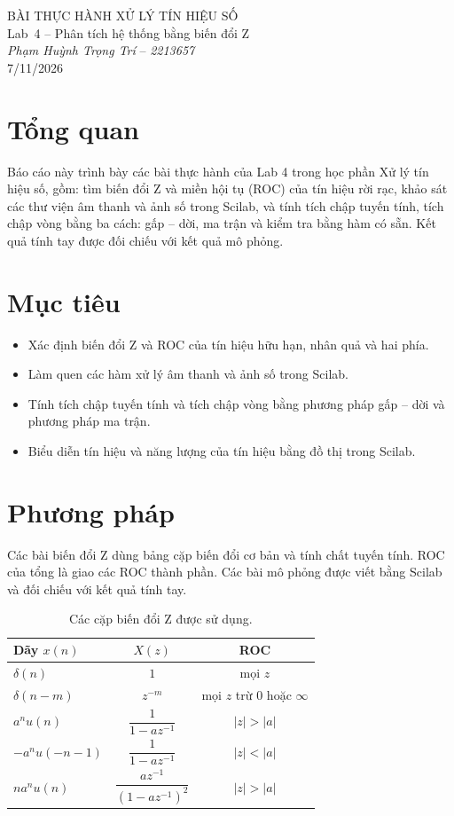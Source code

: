 \documentclass[12pt,a4paper]{article}
\newcommand{\ngaynop}{7/11/2026}
\newcommand{\thanhvien}{%
  \textit{Phạm Huỳnh Trọng Trí} -- \textit{2213657}}
\begin{document}
\begin{center}
  {\Large BÀI THỰC HÀNH XỬ LÝ TÍN HIỆU SỐ}\\[1.2em]
  {\Large Lab\ 4 -- Phân tích hệ thống bằng biến đổi Z}\\[1.5em]
  \thanhvien\\[1.5em]
  \ngaynop
\end{center}

\section*{Tổng quan}
Báo cáo này trình bày các bài thực hành của Lab 4 trong học phần Xử lý tín hiệu số, gồm:
tìm biến đổi Z và miền hội tụ (ROC) của tín hiệu rời rạc, khảo sát các thư viện âm thanh và
ảnh số trong Scilab, và tính tích chập tuyến tính, tích chập vòng bằng ba cách: gấp -- dời,
ma trận và kiểm tra bằng hàm có sẵn. Kết quả tính tay được đối chiếu với kết quả mô phỏng.

\section*{Mục tiêu}
\begin{itemize}[nosep]
  \item Xác định biến đổi Z và ROC của tín hiệu hữu hạn, nhân quả và hai phía.
  \item Làm quen các hàm xử lý âm thanh và ảnh số trong Scilab.
  \item Tính tích chập tuyến tính và tích chập vòng bằng phương pháp gấp -- dời và phương pháp ma trận.
  \item Biểu diễn tín hiệu và năng lượng của tín hiệu bằng đồ thị trong Scilab.
\end{itemize}

\section*{Phương pháp}
Các bài biến đổi Z dùng bảng cặp biến đổi cơ bản và tính chất tuyến tính. ROC của tổng là giao
các ROC thành phần. Các bài mô phỏng được viết bằng Scilab và đối chiếu với kết quả tính tay.

\begin{table}[H]
\centering
\begin{tabular}{lcc}
\toprule
Dãy $x(n)$ & $X(z)$ & ROC \\
\midrule
$\delta(n)$ & $1$ & mọi $z$ \\
$\delta(n-m)$ & $z^{-m}$ & mọi $z$ trừ $0$ hoặc $\infty$ \\
$a^n u(n)$ & $\dfrac{1}{1-az^{-1}}$ & $|z|>|a|$ \\
$-a^n u(-n-1)$ & $\dfrac{1}{1-az^{-1}}$ & $|z|<|a|$ \\
$n a^n u(n)$ & $\dfrac{az^{-1}}{(1-az^{-1})^2}$ & $|z|>|a|$ \\
\bottomrule
\end{tabular}
\caption{Các cặp biến đổi Z được sử dụng.}
\end{table}
\end{document}
